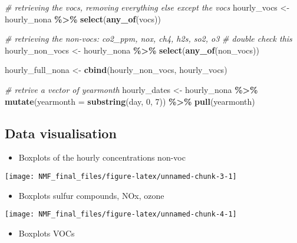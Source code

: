 \documentclass[
]{article}
\newenvironment{Shaded}{\begin{snugshade}}{\end{snugshade}}
\newcommand{\AttributeTok}[1]{\textcolor[rgb]{0.13,0.29,0.53}{#1}}
\newcommand{\CommentTok}[1]{\textcolor[rgb]{0.56,0.35,0.01}{\textit{#1}}}
\newcommand{\DecValTok}[1]{\textcolor[rgb]{0.00,0.00,0.81}{#1}}
\newcommand{\FunctionTok}[1]{\textcolor[rgb]{0.13,0.29,0.53}{\textbf{#1}}}
\newcommand{\NormalTok}[1]{#1}
\newcommand{\OtherTok}[1]{\textcolor[rgb]{0.56,0.35,0.01}{#1}}
\newcommand{\SpecialCharTok}[1]{\textcolor[rgb]{0.81,0.36,0.00}{\textbf{#1}}}
\providecommand{\tightlist}{%
  \setlength{\itemsep}{0pt}\setlength{\parskip}{0pt}}
\begin{document}
\begin{Shaded}
\begin{Highlighting}[]
\CommentTok{\# retrieving the vocs, removing everything else except the vocs}
\NormalTok{hourly\_vocs }\OtherTok{\textless{}{-}}\NormalTok{ hourly\_nona }\SpecialCharTok{\%\textgreater{}\%} \FunctionTok{select}\NormalTok{(}\FunctionTok{any\_of}\NormalTok{(vocs))}

\CommentTok{\# retrieving the non{-}vocs: co2\_ppm, nox, ch4, h2s, so2, o3}
\CommentTok{\# double check this}
\NormalTok{hourly\_non\_vocs }\OtherTok{\textless{}{-}}\NormalTok{ hourly\_nona }\SpecialCharTok{\%\textgreater{}\%} \FunctionTok{select}\NormalTok{(}\FunctionTok{any\_of}\NormalTok{(non\_vocs)) }

\NormalTok{hourly\_full\_nona }\OtherTok{\textless{}{-}} \FunctionTok{cbind}\NormalTok{(hourly\_non\_vocs, hourly\_vocs)}

\CommentTok{\# retrive a vector of yearmonth}
\NormalTok{hourly\_dates }\OtherTok{\textless{}{-}}\NormalTok{ hourly\_nona }\SpecialCharTok{\%\textgreater{}\%} 
  \FunctionTok{mutate}\NormalTok{(}\AttributeTok{yearmonth =} \FunctionTok{substring}\NormalTok{(day, }\DecValTok{0}\NormalTok{, }\DecValTok{7}\NormalTok{)) }\SpecialCharTok{\%\textgreater{}\%}
  \FunctionTok{pull}\NormalTok{(yearmonth)}
\end{Highlighting}
\end{Shaded}

\subsection{Data visualisation}\label{data-visualisation}

\begin{itemize}
\tightlist
\item
  Boxplots of the hourly concentrations non-voc
\end{itemize}

\texttt{[image: NMF\_final\_files/figure-latex/unnamed-chunk-3-1]}

\begin{itemize}
\tightlist
\item
  Boxplots sulfur compounds, NOx, ozone
\end{itemize}

\texttt{[image: NMF\_final\_files/figure-latex/unnamed-chunk-4-1]}

\begin{itemize}
\tightlist
\item
  Boxplots VOCs
\end{itemize}
\end{document}
